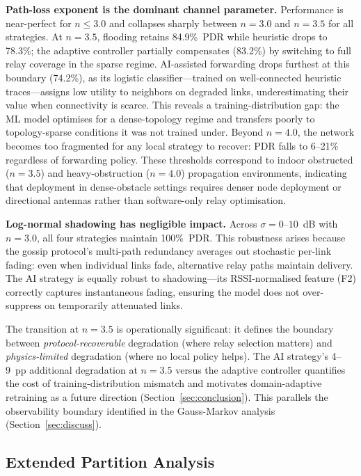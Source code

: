 \documentclass[conference]{IEEEtran}
\begin{document}
\textbf{Path-loss exponent is the dominant channel parameter.}  Performance
is near-perfect for $n \leq 3.0$ and collapses sharply between $n=3.0$ and
$n=3.5$ for all strategies.  At $n=3.5$, flooding retains 84.9\%~PDR while
heuristic drops to 78.3\%; the adaptive controller partially compensates (83.2\%)
by switching to full relay coverage in the sparse regime.  AI-assisted forwarding
drops furthest at this boundary (74.2\%), as its logistic classifier---trained on
well-connected heuristic traces---assigns low utility to neighbors on degraded
links, underestimating their value when connectivity is scarce.  This reveals a
training-distribution gap: the ML model optimises for a dense-topology regime
and transfers poorly to topology-sparse conditions it was not trained under.
Beyond $n=4.0$, the network becomes too fragmented for any local strategy to
recover: PDR falls to 6--21\% regardless of forwarding policy.  These thresholds
correspond to indoor obstructed ($n=3.5$) and heavy-obstruction ($n=4.0$)
propagation environments, indicating that deployment in dense-obstacle settings
requires denser node deployment or directional antennas rather than software-only
relay optimisation.

\textbf{Log-normal shadowing has negligible impact.}  Across $\sigma =
0$--$10$~dB with $n=3.0$, all four strategies maintain 100\%~PDR.
This robustness arises because the gossip protocol's multi-path redundancy
averages out stochastic per-link fading: even when individual links fade,
alternative relay paths maintain delivery.  The AI strategy is equally robust
to shadowing---its RSSI-normalised feature (F2) correctly captures instantaneous
fading, ensuring the model does not over-suppress on temporarily attenuated links.

The transition at $n=3.5$ is operationally significant: it defines the
boundary between \emph{protocol-recoverable} degradation (where relay
selection matters) and \emph{physics-limited} degradation (where no local
policy helps).  The AI strategy's 4--9~pp additional degradation at $n=3.5$
versus the adaptive controller quantifies the cost of training-distribution
mismatch and motivates domain-adaptive retraining as a future direction
(Section~\ref{sec:conclusion}).  This parallels the observability boundary
identified in the Gauss-Markov analysis (Section~\ref{sec:discuss}).

\subsection{Extended Partition Analysis}
\end{document}
